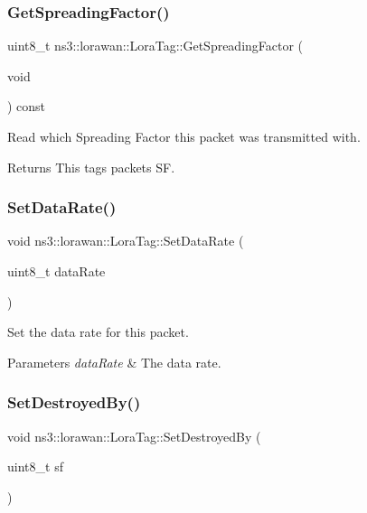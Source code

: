 \subsubsection{\texorpdfstring{Get\+Spreading\+Factor()}{GetSpreadingFactor()}}
{\footnotesize\ttfamily uint8\+\_\+t ns3\+::lorawan\+::\+Lora\+Tag\+::\+Get\+Spreading\+Factor (\begin{DoxyParamCaption}\item[{void}]{ }\end{DoxyParamCaption}) const}

Read which Spreading Factor this packet was transmitted with.

\begin{DoxyReturn}{Returns}
This tag\textquotesingle{}s packet\textquotesingle{}s SF. 
\end{DoxyReturn}
\mbox{\label{classns3_1_1lorawan_1_1LoraTag_a539be1f167fb209d8e3105dc99779c88}} 
\subsubsection{\texorpdfstring{Set\+Data\+Rate()}{SetDataRate()}}
{\footnotesize\ttfamily void ns3\+::lorawan\+::\+Lora\+Tag\+::\+Set\+Data\+Rate (\begin{DoxyParamCaption}\item[{uint8\+\_\+t}]{data\+Rate }\end{DoxyParamCaption})}

Set the data rate for this packet.


\begin{DoxyParams}{Parameters}
{\em data\+Rate} & The data rate. \\
\hline
\end{DoxyParams}
\mbox{\label{classns3_1_1lorawan_1_1LoraTag_ad420b4023f8ddeb1b7ea8d63255a718d}} 
\subsubsection{\texorpdfstring{Set\+Destroyed\+By()}{SetDestroyedBy()}}
{\footnotesize\ttfamily void ns3\+::lorawan\+::\+Lora\+Tag\+::\+Set\+Destroyed\+By (\begin{DoxyParamCaption}\item[{uint8\+\_\+t}]{sf }\end{DoxyParamCaption})}

